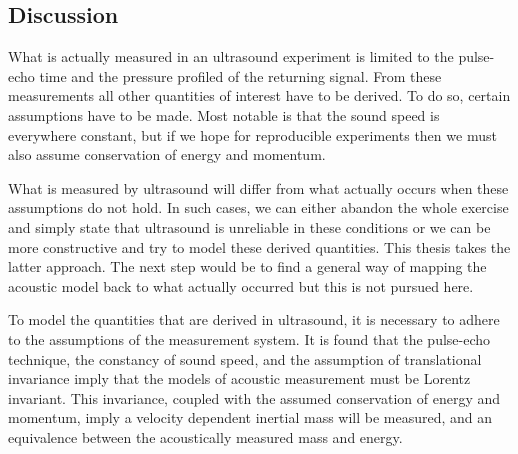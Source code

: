 

\subsection{Discussion}


What is actually measured in an ultrasound experiment is limited
to the pulse-echo time and the pressure profiled of the returning signal.
From these measurements all other quantities of interest have to be derived.
To do so,
certain assumptions have to be made.
Most notable is that the sound speed is everywhere constant,
but if we hope for reproducible experiments then we must also assume conservation of energy and momentum.

What is measured by ultrasound will differ from what actually occurs when these assumptions do not hold.
In such cases, 
we can either abandon the whole exercise and simply state that ultrasound is unreliable in these conditions
or we can be more constructive and try to model these derived quantities. 
This thesis takes the latter approach.
The next step would be to find a general way of mapping the acoustic model back to what actually occurred but this is not pursued here.

To model the quantities that are derived in ultrasound, 
it is necessary to adhere to the assumptions of the measurement system.
It is found that the pulse-echo technique, the constancy of sound speed, and the assumption of translational invariance
imply that the models of acoustic measurement must be Lorentz invariant.
This invariance, coupled with the assumed conservation of energy and momentum,
imply a velocity dependent inertial mass will be measured,
and an equivalence between the acoustically measured mass and energy.
 
